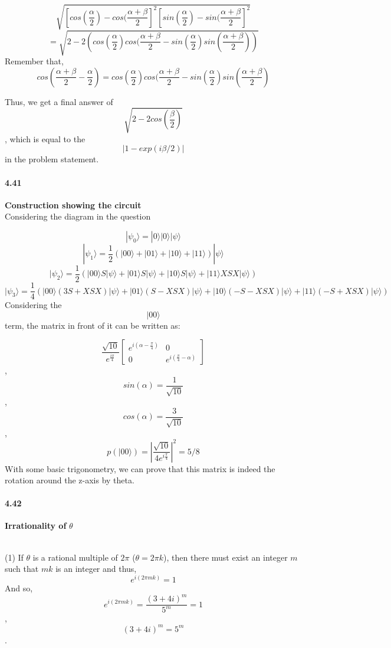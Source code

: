 $$\sqrt{\left[ cos(\frac{\alpha}{2}) - cos(\frac{\alpha + \beta}{2}\right]^2 \left[ sin(\frac{\alpha}{2}) - sin(\frac{\alpha + \beta}{2}\right]^2}$$
$$= \sqrt{2-2\left( cos(\frac{\alpha}{2})cos(\frac{\alpha + \beta}{2} - sin(\frac{\alpha}{2})sin(\frac{\alpha + \beta}{2}) \right)}$$
Remember that, 
$$cos(\frac{\alpha + \beta}{2} - \frac{\alpha}{2}) = cos(\frac{\alpha}{2})cos(\frac{\alpha + \beta}{2} - sin(\frac{\alpha}{2})sin(\frac{\alpha + \beta}{2})$$


Thus, we get a final answer of $$\sqrt{2-2cos(\frac{\beta}{2})}$$, which is equal to the $$|1-exp(i\beta /2)|$$ in the problem statement.


\paragraph{4.41} \textbf{Construction showing the circuit}
\\

Considering the diagram in the question


$$|\psi_0 \rangle = |0\rangle |0\rangle |\psi \rangle  $$
$$|\psi_1 \rangle = \frac{1}{2}(|00\rangle + |01\rangle + |10\rangle + |11\rangle)|\psi \rangle$$
$$|\psi_2 \rangle = \frac{1}{2}(|00\rangle S|\psi \rangle + |01\rangle S|\psi \rangle + |10\rangle S|\psi \rangle + |11\rangle XSX|\psi \rangle)$$
$$|\psi_3 \rangle = \frac{1}{4}(|00\rangle (3S + XSX) |\psi \rangle + |01\rangle (S-XSX)|\psi \rangle + |10\rangle (-S-XSX)|\psi \rangle + |11\rangle (-S+XSX)|\psi \rangle)$$
Considering the $$|00\rangle$$ term, the matrix in front of it can be written as:


$$\frac{\sqrt{10}}{e^{\frac{i\pi}{4}}} \begin{bmatrix} e^{i(\alpha-\frac{\pi}{4})}& 0\\0 & e^{i(\frac{\pi}{4} - \alpha)}\end{bmatrix}$$, $$sin(\alpha) = \frac{1}{\sqrt{10}}$$, $$cos(\alpha) = \frac{3}{\sqrt{10}}$$,
$$p(|00\rangle) = \left| \frac{\sqrt{10}}{4e^{i\frac{\pi}{4}}} \right|^2 = 5/8$$
With some basic trigonometry, we can prove that this matrix is indeed the rotation around the z-axis by theta.


\paragraph{4.42} \textbf{Irrationality of } $\theta$

\\
(1) If $\theta$ is a rational multiple of $2\pi$ ($\theta = 2\pi k$), then there must exist an integer $m$ such that $mk$ is an integer and thus,
$$e^{i(2\pi mk)} = 1$$ 
And so,
$$e^{i(2\pi mk)} = \frac{(3+4i)^m}{5^m} = 1$$, 
$$(3+4i)^m = 5^m$$.



